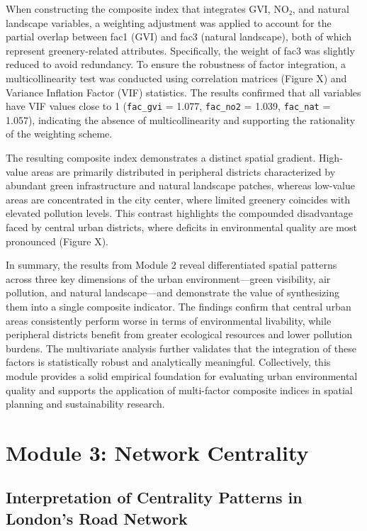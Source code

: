\documentclass[
  12pt,
  oneside]{book}
\begin{document}
When constructing the composite index that integrates GVI, NO₂, and natural landscape variables, a weighting adjustment was applied to account for the partial overlap between fac1 (GVI) and fac3 (natural landscape), both of which represent greenery-related attributes. Specifically, the weight of fac3 was slightly reduced to avoid redundancy. To ensure the robustness of factor integration, a multicollinearity test was conducted using correlation matrices (Figure X) and Variance Inflation Factor (VIF) statistics. The results confirmed that all variables have VIF values close to 1 (\texttt{fac\_gvi} = 1.077, \texttt{fac\_no2} = 1.039, \texttt{fac\_nat} = 1.057), indicating the absence of multicollinearity and supporting the rationality of the weighting scheme.

The resulting composite index demonstrates a distinct spatial gradient. High-value areas are primarily distributed in peripheral districts characterized by abundant green infrastructure and natural landscape patches, whereas low-value areas are concentrated in the city center, where limited greenery coincides with elevated pollution levels. This contrast highlights the compounded disadvantage faced by central urban districts, where deficits in environmental quality are most pronounced (Figure X).

In summary, the results from Module 2 reveal differentiated spatial patterns across three key dimensions of the urban environment---green visibility, air pollution, and natural landscape---and demonstrate the value of synthesizing them into a single composite indicator. The findings confirm that central urban areas consistently perform worse in terms of environmental livability, while peripheral districts benefit from greater ecological resources and lower pollution burdens. The multivariate analysis further validates that the integration of these factors is statistically robust and analytically meaningful. Collectively, this module provides a solid empirical foundation for evaluating urban environmental quality and supports the application of multi-factor composite indices in spatial planning and sustainability research.

\section{Module 3: Network Centrality}\label{module-3-network-centrality}

\subsection{Interpretation of Centrality Patterns in London's Road Network}\label{interpretation-of-centrality-patterns-in-londons-road-network}
\end{document}
